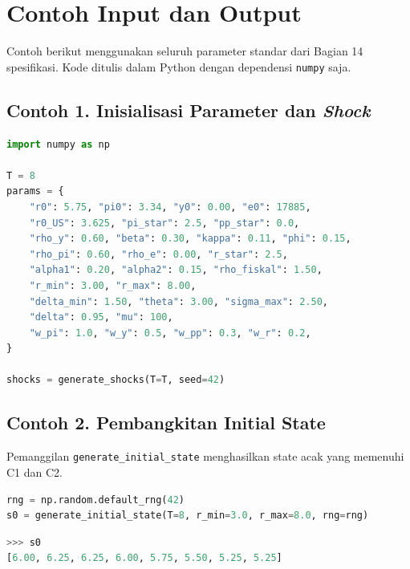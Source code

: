 \section{Contoh Input dan Output}

Contoh berikut menggunakan seluruh parameter standar dari Bagian 14 spesifikasi. Kode ditulis dalam Python dengan dependensi \texttt{numpy} saja.

\subsection*{Contoh 1. Inisialisasi Parameter dan \textit{Shock}}

\begin{tcolorbox}[title=Input]
    \begin{lstlisting}[language=Python]
import numpy as np

T = 8
params = {
    "r0": 5.75, "pi0": 3.34, "y0": 0.00, "e0": 17885,
    "r0_US": 3.625, "pi_star": 2.5, "pp_star": 0.0,
    "rho_y": 0.60, "beta": 0.30, "kappa": 0.11, "phi": 0.15,
    "rho_pi": 0.60, "rho_e": 0.00, "r_star": 2.5,
    "alpha1": 0.20, "alpha2": 0.15, "rho_fiskal": 1.50,
    "r_min": 3.00, "r_max": 8.00,
    "delta_min": 1.50, "theta": 3.00, "sigma_max": 2.50,
    "delta": 0.95, "mu": 100,
    "w_pi": 1.0, "w_y": 0.5, "w_pp": 0.3, "w_r": 0.2,
}

shocks = generate_shocks(T=T, seed=42)
\end{lstlisting}
\end{tcolorbox}

\subsection*{Contoh 2. Pembangkitan Initial State}

Pemanggilan \texttt{generate\_initial\_state} menghasilkan state acak yang memenuhi C1 dan C2.

\begin{tcolorbox}[title=Input]
    \begin{lstlisting}[language=Python]
rng = np.random.default_rng(42)
s0 = generate_initial_state(T=8, r_min=3.0, r_max=8.0, rng=rng)
\end{lstlisting}
\end{tcolorbox}

\begin{tcolorbox}[title=Output]
    \begin{lstlisting}[language=Python]
>>> s0
[6.00, 6.25, 6.25, 6.00, 5.75, 5.50, 5.25, 5.25]
\end{lstlisting}
\end{tcolorbox}


